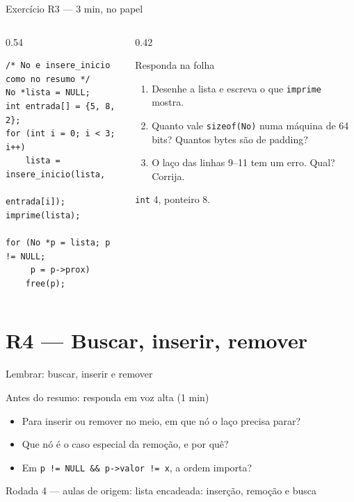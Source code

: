 \documentclass[aspectratio=169]{beamer}
\newcommand{\rodada}[4]{%
  \begin{frame}{Lembrar: #2}
    \begin{block}{Antes do resumo: responda em voz alta (1 min)}
      #4
    \end{block}
    \vfill
    {\small\textcolor{UFSGray}{Rodada #1 --- aulas de origem:} #3}
  \end{frame}}
\begin{document}
\begin{frame}[fragile]{Exercício R3 --- 3 min, no papel}
  \begin{columns}[T]
    \begin{column}{0.54\textwidth}
\begin{lstlisting}[style=numC]
/* No e insere_inicio como no resumo */
No *lista = NULL;
int entrada[] = {5, 8, 2};
for (int i = 0; i < 3; i++)
    lista = insere_inicio(lista,
                          entrada[i]);
imprime(lista);

for (No *p = lista; p != NULL;
     p = p->prox)
    free(p);
\end{lstlisting}
    \end{column}
    \begin{column}{0.42\textwidth}
      \begin{block}{Responda na folha}
        \small
        \begin{enumerate}
          \item[(a)] Desenhe a lista e escreva o que \texttt{imprime} mostra.
          \item[(b)] Quanto vale \texttt{sizeof(No)} numa máquina de 64 bits?
            Quantos bytes são de padding?
          \item[(c)] O laço das linhas 9--11 tem um erro. Qual? Corrija.
        \end{enumerate}
      \end{block}
      \scriptsize\textcolor{UFSGray}{\texttt{int} 4, ponteiro 8.}
    \end{column}
  \end{columns}
\end{frame}

\section{R4 --- Buscar, inserir, remover}

\rodada{4}{buscar, inserir e remover}{lista encadeada: inserção, remoção e busca}{
  \begin{itemize}
    \item Para inserir ou remover no meio, em que nó o laço precisa parar?
    \item Que nó é o caso especial da remoção, e por quê?
    \item Em \texttt{p != NULL \&\& p->valor != x}, a ordem importa?
  \end{itemize}}
\end{document}
